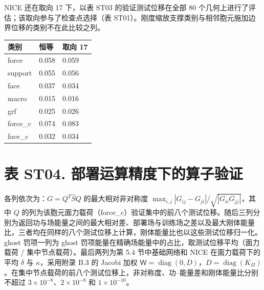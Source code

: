 \documentclass[preprint,12pt,authoryear]{elsarticle}
\begin{document}
NICE 还在取向 17 下，以表 ST03 的验证测试位移在全部 80 个几何上进行了评估；该取向参与了检查点选择（表 ST01）。刚度缩放支撑类别与相邻胞元施加边界位移的类别不在此比较之列。

{\small
\begin{longtable}[]{@{}lll@{}}
\toprule\noalign{}
类别 & 恒等 & 取向 17 \\
\midrule\noalign{}
\endhead
\bottomrule\noalign{}
\endlastfoot
force & 0.058 & 0.059 \\
support & 0.055 & 0.056 \\
face & 0.037 & 0.034 \\
macro & 0.015 & 0.016 \\
grf & 0.025 & 0.026 \\
force\_c & 0.074 & 0.083 \\
face\_c & 0.032 & 0.034 \\
\end{longtable}}

\section{表 ST04. 部署运算精度下的算子验证}

各列依次为：\(G=Q^T\widehat SQ\) 的最大相对非对称度 \(\max_{i,j}|G_{ij}-G_{ji}|/\sqrt{|G_{ii}G_{jj}|}\)，其中 \(Q\) 的列为该胞元面力载荷（force\_c）验证集中的前八个测试位移。随后三列分别为返回功与场能量之间的最大相对差、部署场与训练场之差以及最大刚体能量比，三者均在同样的八个测试位移上计算，刚体能量比也以这些测试位移归一化。ghost 罚项一列为 ghost 罚项能量在精确场能量中的占比，取测试位移平均（面力载荷 / 集中节点载荷）。最后两列为第 5.4 节中基础网络和 NICE 在面力载荷下的平均 \(\delta\) 与 \(\kappa\)，采用附录 B.3 的 Jacobi 加权 \(\mathsf W=\operatorname{diag}(0,D)\)，\(D=\operatorname{diag}(K_{II})\)。在集中节点载荷的前八个测试位移上，非对称度、功--能量差和刚体能量比分别不超过 \(3\times10^{-8}\)、\(2\times10^{-8}\) 和 \(1\times10^{-10}\)。
\end{document}
